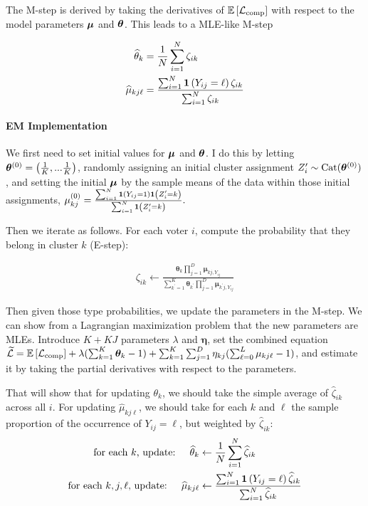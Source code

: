 \documentclass[11pt]{article}
\begin{document}
The M-step is derived by taking the derivatives of \(\mathbb{E}\left[\mathcal{L}_{\text{comp}}\right]\) with respect to the model parameters \(\bm{\mu}\) and \(\bm{\theta}\). This leads to a MLE-like M-step

\begin{align}
\widehat{\theta}_{k} &= \frac{1}{N}\sum^N_{i = 1}\zeta_{ik}\\
\widehat{\mu}_{kj\ell} &= \frac{\sum^N_{i=1}\bm{1}\left(Y_{ij} = \ell\right)\zeta_{ik}}{\sum^{N}_{i=1}\zeta_{ik}}
\end{align}


\paragraph{EM Implementation} We first need to set initial values for \(\bm{\mu}\) and \(\bm{\theta}\). I do this by letting \(\bm{\theta}^{(0)} = \left(\frac{1}{K},...\frac{1}{K}\right)\), randomly assigning an initial cluster assignment \(Z_i^\prime \sim \text{Cat}(\bm{\theta}^{(0)})\), and setting the initial \(\bm{\mu}\) by the sample means of the data within those initial assignments, \(\mu_{kj}^{(0)} = \frac{\sum_{i=1}^{N}\bm{1}\left(Y_{ij} = 1\right)\bm{1}\left(Z_{i}^{\prime} = k\right)}{\sum_{i=1}^{N}\bm{1}\left(Z_{i}^{\prime} = k\right)}.\) 

Then we iterate as follows. For each voter \(i\), compute the probability that they belong in cluster \(k\) (E-step):

\begin{align}
\zeta_{ik} \leftarrow \frac{\bm{\theta}_{k}\prod^{D}_{j=1}\bm{\mu}_{kj,Y_{ij}}}
{\sum^{K}_{k^\prime=1}\bm{\theta}_{k^\prime}\prod^{D}_{j=1}\bm{\mu}_{k^\prime j,Y_{ij}}}
\end{align}

Then given those type probabilities, we update the parameters in the M-step. We can show from a Lagrangian maximization problem that the new parameters are MLEs.  Introduce \(K + KJ\) parameters \(\lambda\) and \(\bm{\eta}\), set the combined equation \(\widetilde{\mathcal{L}} = \mathbb{E}\left[\mathcal{L}_\text{comp}\right] + \lambda(\sum^{K}_{k=1}\bm{\theta}_k - 1) + \sum^{K}_{k=1}\sum^{D}_{j=1}\eta_{kj}(\sum^{L}_{\ell=0}\mu_{kj\ell} - 1) \), and estimate it by taking the partial derivatives with respect to the parameters.

That will show that for updating \(\theta_k\), we should take the simple average of \(\widehat\zeta_{ik}\) across all \(i\). For updating \(\widehat\mu_{kj\ell}\), we should take for each \(k\) and \(\ell\) the sample proportion of the occurrence of \(Y_{ij} = \ell\), but weighted by \(\widehat\zeta_{ik}\):
\begin{align}
\text{for each \(k\), update: }~~~  \widehat{\theta}_{k} &\leftarrow \frac{1}{N}\sum^N_{i = 1}\widehat{\zeta}_{ik} \\
\text{for each \(k, j, \ell\), update: }~~~ \widehat{\mu}_{kj\ell} &\leftarrow\frac{\sum^N_{i=1}\bm{1}\left(Y_{ij} = \ell\right)\widehat{\zeta}_{ik}}{\sum^{N}_{i=1}\widehat{\zeta}_{ik}}
\end{align}
\end{document}
